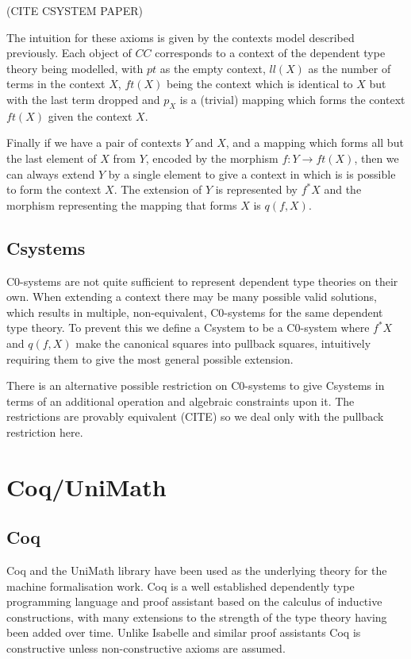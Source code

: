 (CITE CSYSTEM PAPER)

The intuition for these axioms is given by the contexts model described
previously. Each object of $CC$ corresponds to a context of the dependent type
theory being modelled, with $pt$ as the empty context, $ll(X)$ as the number of
terms in the context $X$, $ft(X)$ being the context which is identical to $X$
but with the last term dropped and $p_X$ is a (trivial) mapping which forms the
context $ft(X)$ given the context $X$.

Finally if we have a pair of contexts $Y$ and $X$, and a mapping which forms all
but the last element of $X$ from $Y$, encoded by the morphism $f: Y\to ft(X)$,
then we can always extend $Y$ by a single element to give a context in which is
is possible to form the context $X$. The extension of $Y$ is represented by
$f^*X$ and the morphism representing the mapping that forms $X$ is $q(f, X)$.

\subsection{Csystems}
C0-systems are not quite sufficient to represent dependent type theories on
their own. When extending a context there may be many possible valid solutions,
which results in multiple, non-equivalent, C0-systems for the same dependent
type theory. To prevent this we define a Csystem to be a C0-system where $f^*X$
and $q(f, X)$ make the canonical squares into pullback squares, intuitively
requiring them to give the most general possible extension.

There is an alternative possible restriction on C0-systems to give Csystems in
terms of an additional operation and algebraic constraints upon it. The
restrictions are provably equivalent (CITE) so we deal only with the pullback
restriction here.

\section{Coq/UniMath}
\subsection{Coq}
Coq and the UniMath library have been used as the underlying theory for the
machine formalisation work. Coq is a well established dependently type
programming language and proof assistant based on the calculus of inductive
constructions, with many extensions to the strength of the type theory having
been added over time. Unlike Isabelle and similar proof assistants Coq is
constructive unless non-constructive axioms are assumed. 

